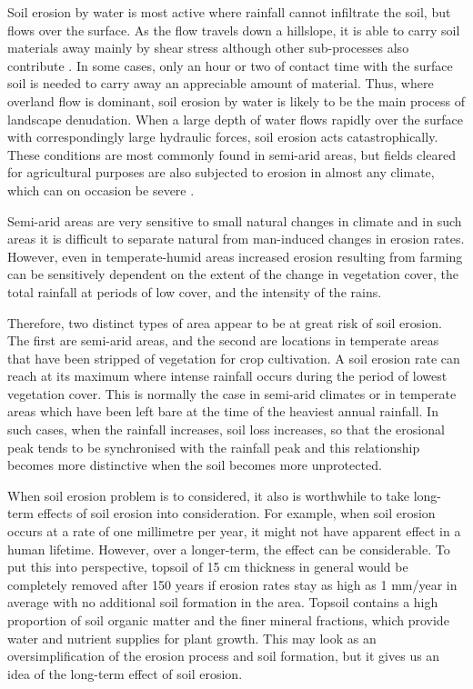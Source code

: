 Soil erosion by water is most active where rainfall cannot infiltrate the soil,
but flows over the surface. As the flow travels down a hillslope, it is able to
carry soil materials away mainly by shear stress although other sub-processes
also contribute \citep[see also Figure
\ref{fig:kinnell}]{kinnell2000-discourse,kinnell2005-2815}. In some
cases, only an hour or two of contact time with the surface soil is needed to
carry away an appreciable amount of material. Thus, where overland flow is
dominant, soil erosion by water is likely to be the main process of landscape
denudation. When a large depth of water flows rapidly over the surface with
correspondingly large hydraulic forces, soil erosion acts catastrophically.
These conditions are most commonly found in semi-arid areas, but fields cleared
for agricultural purposes are also subjected to erosion in almost any climate,
which can on occasion be severe \citep{boardman2001-346,boardman2003-176}.

Semi-arid areas are very sensitive to small natural changes in climate and in
such areas it is difficult to separate natural from man-induced changes in
erosion rates. However, even in temperate-humid areas increased erosion
resulting from farming can be sensitively dependent on the extent of the change
in vegetation cover, the total rainfall at periods of low cover, and the
intensity of the rains.

Therefore, two distinct types of area appear to be at great risk of soil
erosion. The first are semi-arid areas, and the second are locations in
temperate areas that have been stripped of vegetation for crop cultivation. A
soil erosion rate can reach at its maximum where intense rainfall occurs during
the period of lowest vegetation cover. This is normally the case in semi-arid
climates or in temperate areas which have been left bare at the time of the
heaviest annual rainfall. In such cases, when the rainfall increases, soil loss
increases, so that the erosional peak tends to be synchronised with the rainfall
peak and this relationship becomes more distinctive when the soil becomes more
unprotected.

When soil erosion problem is to considered, it also is worthwhile to take
long-term effects of soil erosion into consideration. For example, when soil
erosion occurs at a rate of one millimetre per year, it might not have apparent
effect in a human lifetime. However, over a longer-term, the effect can be
considerable. To put this into perspective, topsoil of 15 cm thickness in
general would be completely removed after 150 years if erosion rates stay as
high as 1 mm/year in average with no additional soil formation in the area.
Topsoil contains a high proportion of soil organic matter and the finer mineral
fractions, which provide water and nutrient supplies for plant growth. This may
look as an oversimplification of the erosion process and soil formation, but it
gives us an idea of the long-term effect of soil erosion.

